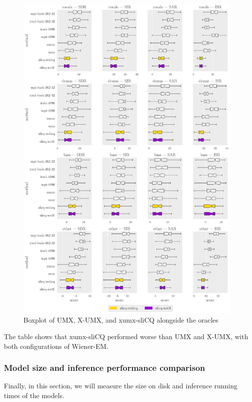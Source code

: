 \documentclass[report.tex]{subfiles}
\begin{document}
\begin{figure}[ht]
	\centering
	\includegraphics[width=\textwidth]{./images-bss/boxplot_full.pdf}
	\caption{Boxplot of UMX, X-UMX, and xumx-sliCQ alongside the oracles}
	\label{fig:bssboxplot}
\end{figure}

The table shows that xumx-sliCQ performed worse than UMX and X-UMX, with both configurations of Wiener-EM.

\newpagefill

\subsubsection{Model size and inference performance comparison}
\label{sec:inferenceperf}

Finally, in this section, we will measure the size on disk and inference running times of the models.
\end{document}
